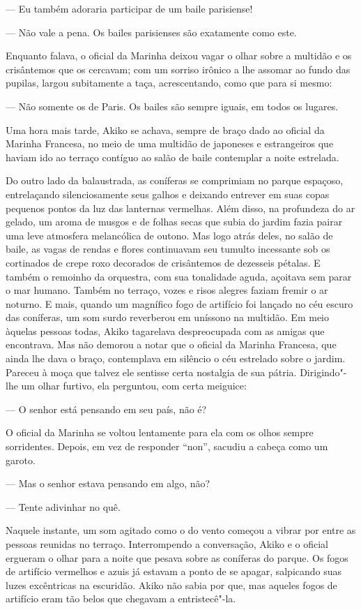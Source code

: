 --- Eu também adoraria participar de um baile parisiense!

--- Não vale a pena. Os bailes parisienses são exatamente como este.

Enquanto falava, o oficial da Marinha deixou vagar o olhar sobre a
multidão e os crisântemos que os cercavam; com um sorriso irônico a lhe
assomar ao fundo das pupilas, largou subitamente a taça, acrescentando,
como que para si mesmo:

--- Não somente os de Paris. Os bailes são sempre iguais, em todos os
lugares.

Uma hora mais tarde, Akiko se achava, sempre de braço dado ao oficial da 
Marinha Francesa, no meio de uma multidão de japoneses e estrangeiros
que haviam ido ao terraço contíguo ao salão de baile contemplar a noite
estrelada.

Do outro lado da balaustrada, as coníferas se comprimiam no parque
espaçoso, entrelaçando silenciosamente seus galhos e deixando entrever
em suas copas pequenos pontos da luz das lanternas vermelhas. Além
disso, na profundeza do ar gelado, um aroma de musgos e de folhas secas
que subia do jardim fazia pairar uma leve atmosfera melancólica de
outono. Mas logo atrás deles, no salão de baile, as vagas de rendas e
flores continuavam seu tumulto incessante sob os cortinados de crepe
roxo decorados de crisântemos de dezesseis pétalas. E também o remoinho
da orquestra, com sua tonalidade aguda, açoitava sem parar o mar
humano. Também no terraço, vozes e risos alegres faziam fremir o ar
noturno. E mais, quando um magnífico fogo de artifício foi lançado no
céu escuro das coníferas, um som surdo reverberou em uníssono na
multidão. Em meio àquelas pessoas todas, Akiko tagarelava despreocupada
com as amigas que encontrava. Mas não demorou a notar que o oficial da
Marinha Francesa, que ainda lhe dava o braço, contemplava em silêncio o
céu estrelado sobre o jardim. Pareceu à moça que talvez ele sentisse
certa nostalgia de sua pátria. Dirigindo"-lhe um olhar furtivo, ela
perguntou, com certa meiguice:

--- O senhor está pensando em seu país, não é?

O oficial da Marinha se voltou lentamente para ela com os olhos sempre
sorridentes. Depois, em vez de responder ``non'', sacudiu a cabeça como
um garoto.

--- Mas o senhor estava pensando em algo, não?

--- Tente adivinhar no quê.

Naquele instante, um som agitado como o do vento começou a vibrar por 
entre as pessoas reunidas no terraço. Interrompendo a conversação,
Akiko e o oficial ergueram o olhar para a noite que pesava sobre as
coníferas do parque. Os fogos de artifício vermelhos e azuis já estavam
a ponto de se apagar, salpicando suas luzes excêntricas na escuridão.
Akiko não sabia por que, mas aqueles fogos de artifício eram tão belos
que chegavam a entristecê"-la.



